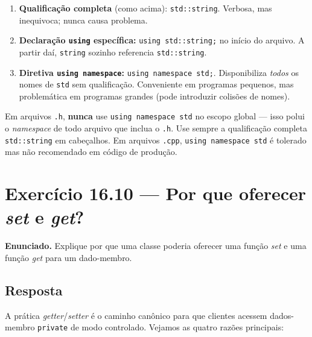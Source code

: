 \documentclass[11pt,a4paper]{article}
\begin{document}
\begin{enumerate}[leftmargin=*,itemsep=0pt]
  \item \textbf{Qualifica\c{c}\~ao completa} (como acima): \texttt{std::string}. Verbosa, mas inequivoca; nunca causa problema.
  \item \textbf{Declara\c{c}\~ao \texttt{using} espec\'ifica:} \texttt{using std::string;} no in\'icio do arquivo. A partir da\'i, \texttt{string} sozinho referencia \texttt{std::string}.
  \item \textbf{Diretiva \texttt{using namespace}:} \texttt{using namespace std;}. Disponibiliza \emph{todos} os nomes de \texttt{std} sem qualifica\c{c}\~ao. Conveniente em programas pequenos, mas problem\'atica em programas grandes (pode introduzir colis\~oes de nomes).
\end{enumerate}

\begin{boaprat}
Em arquivos \texttt{.h}, \textbf{nunca} use \texttt{using namespace std} no escopo global --- isso polui o \emph{namespace} de todo arquivo que inclua o \texttt{.h}. Use sempre a qualifica\c{c}\~ao completa \texttt{std::string} em cabe\c{c}alhos. Em arquivos \texttt{.cpp}, \texttt{using namespace std} \'e tolerado mas n\~ao recomendado em c\'odigo de produ\c{c}\~ao.
\end{boaprat}

\section{Exerc\'icio 16.10 --- Por que oferecer \emph{set} e \emph{get}?}

\begin{enunciado}
\textbf{Enunciado.} Explique por que uma classe poderia oferecer uma fun\c{c}\~ao \emph{set} e uma fun\c{c}\~ao \emph{get} para um dado-membro.
\end{enunciado}

\subsection*{Resposta}

A pr\'atica \emph{getter}/\emph{setter} \'e o caminho can\^onico para que clientes acessem dados-membro \texttt{private} de modo controlado. Vejamos as quatro raz\~oes principais:
\end{document}
